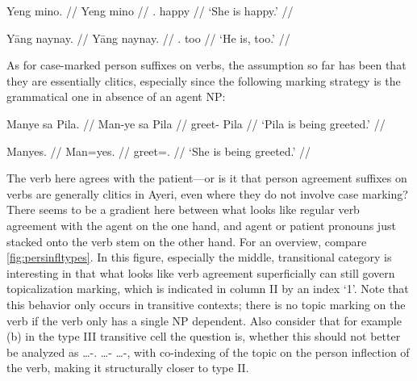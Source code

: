 \pex %
\a\begingl
	\gla Yeng mino. //
	\glb Yeng mino //
	\glc \TsgF{}.\Aarg{} happy //
	\glft `She is happy.' //
\endgl
	
\a\begingl
	\gla Yāng naynay. //
	\glb Yāng naynay. //
	\glc \TsgM{}.\Aarg{} too //
	\glft `He is, too.' //
\endgl

\xe

\label{patagr}
As for case-marked person suffixes on verbs, the assumption so far has been 
that they are essentially clitics, especially since the following marking 
strategy is the grammatical one in absence of an agent NP:

\pex\label{ex:passive} %
\a\label{ex:manye}\begingl
	\gla Manye sa Pila. //
	\glb Man-ye sa ​Pila //
	\glc greet-\TsgF{} \Parg{} ​Pila //
	\glft `Pila is being greeted.' //
\endgl
	
\a\label{ex:manyes}\begingl
	\gla Manyes. //
	\glb Man=yes. //
	\glc greet=\TsgF{}.\Parg{} //
	\glft `She is being greeted.' //
\endgl

\xe

The verb here agrees with the patient---or is it that person agreement 
suffixes on verbs are generally clitics in Ayeri, even where they do not
involve case marking? There seems to be a gradient here between what looks 
like regular verb agreement with the agent on the one hand, and agent or 
patient pronouns just stacked onto the verb stem on the other hand. For an 
overview, compare \autoref{fig:persinfltypes}. In this figure, especially the 
middle, transitional category is interesting in that what looks like verb 
agreement superficially can still govern topicalization marking, which is 
indicated in column II by an index `1'. Note that this behavior only occurs in 
transitive contexts; there is no topic marking on the verb if the verb only has 
a single NP dependent. Also consider that for example (b) in the type III 
transitive cell the question is, whether this should not better be analyzed as 
\AgtT{} …-\TsgM{}.\Top{} …-\Top{} …-\Parg{}, with co-indexing of the topic on 
the person inflection of the verb, making it structurally closer to type II.

